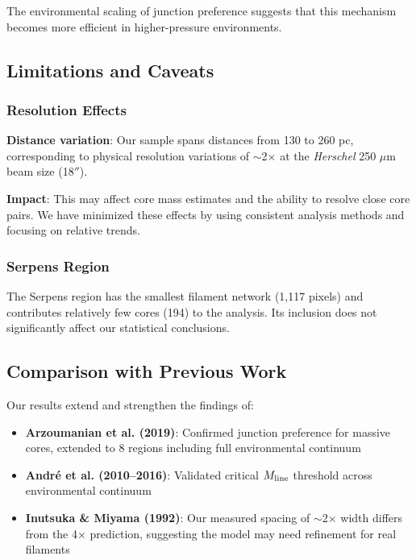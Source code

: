 \documentclass[11pt,a4paper]{article}
\begin{document}
The environmental scaling of junction preference suggests that this mechanism becomes more efficient in higher-pressure environments.

\subsection{Limitations and Caveats}

\subsubsection{Resolution Effects}

\textbf{Distance variation}: Our sample spans distances from 130 to 260 pc, corresponding to physical resolution variations of $\sim$2$\times$ at the \textit{Herschel} 250 $\mu$m beam size (18$''$).

\textbf{Impact}: This may affect core mass estimates and the ability to resolve close core pairs. We have minimized these effects by using consistent analysis methods and focusing on relative trends.

\subsubsection{Serpens Region}

The Serpens region has the smallest filament network (1,117 pixels) and contributes relatively few cores (194) to the analysis. Its inclusion does not significantly affect our statistical conclusions.

\subsection{Comparison with Previous Work}

Our results extend and strengthen the findings of:
\begin{itemize}
    \item \textbf{Arzoumanian et al. (2019)}: Confirmed junction preference for massive cores, extended to 8 regions including full environmental continuum
    \item \textbf{Andr\'e et al. (2010--2016)}: Validated critical $M_{\rm line}$ threshold across environmental continuum
    \item \textbf{Inutsuka \& Miyama (1992)}: Our measured spacing of $\sim$2× width differs from the 4× prediction, suggesting the model may need refinement for real filaments
\end{itemize}
\end{document}
